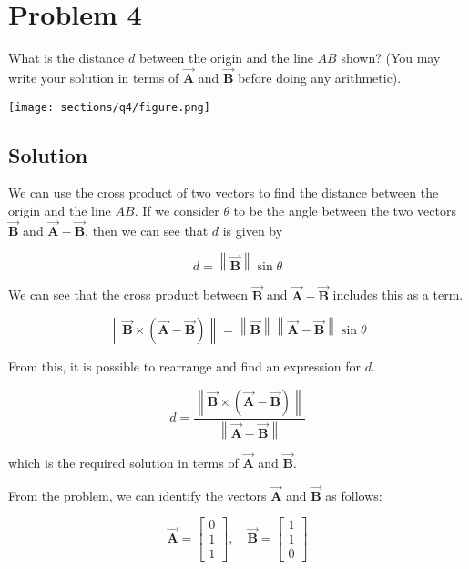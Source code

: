 \section*{Problem 4}

What is the distance \( d \) between the origin and the line \( AB \) shown?
(You may write your solution in terms of \( \vec{\mathbf{A}} \) and \( \vec{\mathbf{B}} \) before doing any arithmetic).

\begin{figure*}[h]
    \centering
    \texttt{[image: sections/q4/figure.png]}
\end{figure*}

\subsection*{Solution}

We can use the cross product of two vectors to find the distance between the origin and the line \( AB \).
If we consider \( \theta \) to be the angle between the two vectors \( \vec{\mathbf{B}} \) and \( \vec{\mathbf{A}} - \vec{\mathbf{B}} \), then we can see that \( d \) is given by

\[
    d = \left\lVert \vec{\mathbf{B}} \right\rVert \sin{\theta}
\]

We can see that the cross product between \( \vec{\mathbf{B}} \) and \( \vec{\mathbf{A}} - \vec{\mathbf{B}} \) includes this as a term.

\[
    \left\lVert \vec{\mathbf{B}} \times (\vec{\mathbf{A}} - \vec{\mathbf{B}}) \right\rVert = \left\lVert \vec{\mathbf{B}} \right\rVert \left\lVert \vec{\mathbf{A}} - \vec{\mathbf{B}} \right\rVert \sin{\theta}
\]

From this, it is possible to rearrange and find an expression for \( d \).

\[
    d = \frac{\left\lVert \vec{\mathbf{B}} \times (\vec{\mathbf{A}} - \vec{\mathbf{B}}) \right\rVert}{\left\lVert \vec{\mathbf{A}} - \vec{\mathbf{B}} \right\rVert}
\]

which is the required solution in terms of \( \vec{\mathbf{A}} \) and \( \vec{\mathbf{B}} \).

From the problem, we can identify the vectors \( \vec{\mathbf{A}} \) and \( \vec{\mathbf{B}} \) as follows:

\[
    \vec{\mathbf{A}} = \begin{bmatrix} 0 \\ 1 \\ 1 \end{bmatrix}, \quad \vec{\mathbf{B}} = \begin{bmatrix} 1 \\ 1 \\ 0 \end{bmatrix}
\]

